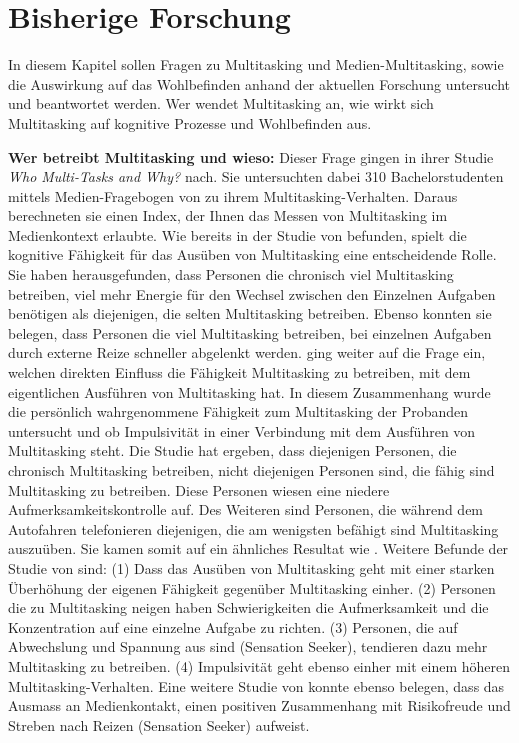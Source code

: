 \section{Bisherige Forschung}\label{section.bisherigeForschung}
In diesem Kapitel sollen Fragen zu Multitasking und Medien-Multitasking, sowie die Auswirkung auf das Wohlbefinden anhand der aktuellen Forschung untersucht und beantwortet werden. Wer wendet Multitasking an, wie wirkt sich Multitasking auf kognitive Prozesse und Wohlbefinden aus. 
\par
\textbf{Wer betreibt Multitasking und wieso:} Dieser Frage gingen  in ihrer Studie \textit{Who Multi-Tasks and Why?} nach. Sie untersuchten dabei 310 Bachelorstudenten mittels Medien-Fragebogen von  zu ihrem Multitasking-Verhalten. Daraus berechneten sie einen Index, der Ihnen das Messen von Multitasking im Medienkontext erlaubte. Wie bereits in der Studie von  befunden, spielt die kognitive Fähigkeit für das Ausüben von Multitasking eine entscheidende Rolle. Sie haben herausgefunden, dass Personen die chronisch viel Multitasking betreiben, viel mehr Energie für den Wechsel zwischen den Einzelnen Aufgaben benötigen als diejenigen, die selten Multitasking betreiben. Ebenso konnten sie belegen, dass Personen die viel Multitasking betreiben, bei einzelnen Aufgaben durch externe Reize schneller abgelenkt werden.  ging weiter auf die Frage ein, welchen direkten Einfluss die Fähigkeit Multitasking zu betreiben, mit dem eigentlichen Ausführen von Multitasking hat. In diesem Zusammenhang wurde die persönlich wahrgenommene Fähigkeit zum Multitasking der Probanden untersucht und ob Impulsivität in einer Verbindung mit dem Ausführen von Multitasking steht. Die Studie hat ergeben, dass diejenigen Personen, die chronisch Multitasking betreiben, nicht diejenigen Personen sind, die fähig sind Multitasking zu betreiben. Diese Personen wiesen eine niedere Aufmerksamkeitskontrolle auf. Des Weiteren sind Personen, die während dem Autofahren telefonieren diejenigen, die am wenigsten befähigt sind Multitasking auszuüben. Sie kamen somit auf ein ähnliches Resultat wie . Weitere Befunde der Studie von  sind: (1) Dass das Ausüben von Multitasking geht mit einer starken Überhöhung der eigenen Fähigkeit gegenüber Multitasking einher. (2) Personen die zu Multitasking neigen haben Schwierigkeiten die Aufmerksamkeit und die Konzentration auf eine einzelne Aufgabe zu richten. (3) Personen, die auf Abwechslung und Spannung aus sind (Sensation Seeker), tendieren dazu mehr Multitasking zu betreiben. (4) Impulsivität geht ebenso einher mit einem höheren Multitasking-Verhalten. Eine weitere Studie von  konnte ebenso belegen, dass das Ausmass an Medienkontakt, einen positiven Zusammenhang mit Risikofreude und Streben nach Reizen (Sensation Seeker) aufweist. 
